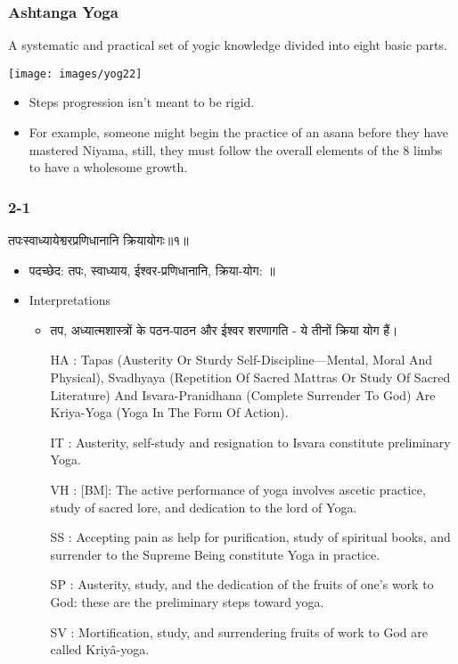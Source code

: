 \begin{frame}[fragile]\frametitle{Ashtanga  Yoga}

A systematic and practical set of yogic knowledge divided into eight basic parts.

\begin{center}
\texttt{[image: images/yog22]}
\end{center}

		\begin{itemize}
		\item Steps progression isn’t meant to be rigid. 
		\item For example, someone might begin the practice of an asana before they have mastered Niyama, still, they must follow the overall elements of the 8 limbs to have a wholesome growth.
		\end{itemize}
		
\end{frame}


\begin{frame}[fragile]\frametitle{2-1}
\begin{sanskrit}
तपःस्वाध्यायेश्वरप्रणिधानानि क्रियायोगः॥१॥
\end{sanskrit}

	\begin{itemize}
	\item पदच्छेद: तपः, स्वाध्याय, ईश्वर-प्रणिधानानि, क्रिया-योग: ॥
	\item Interpretations
		\begin{itemize}
		\item तप, अध्यात्मशास्त्रों के पठन-पाठन और ईश्वर शरणागति - ये तीनों क्रिया योग हैं।
		\item [HA]: Tapas (Austerity Or Sturdy Self-Discipline—Mental, Moral And Physical), Svadhyaya (Repetition Of Sacred Mattras Or Study Of Sacred Literature) And Isvara-Pranidhana (Complete Surrender To God) Are Kriya-Yoga (Yoga In The Form Of Action).
		\item [IT]: Austerity, self-study and resignation to Isvara constitute preliminary Yoga.
		\item [VH]: [BM]: The active performance of yoga involves ascetic practice, study of sacred lore, and dedication to the lord of Yoga.
		\item [SS]: Accepting pain as help for purification, study of spiritual books, and surrender to the Supreme Being constitute Yoga in practice.
		\item [SP]: Austerity, study, and the dedication of the fruits of one’s work to God: these are the preliminary steps toward yoga.
		\item [SV]: Mortification, study, and surrendering fruits of work to God are called Kriyâ-yoga. 
		\end{itemize}
	\end{itemize}
	
\end{frame}

